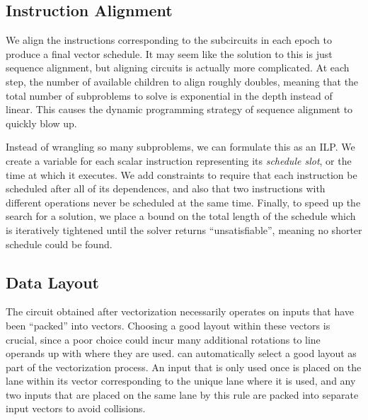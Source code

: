 \subsection{Instruction Alignment}\label{sec:instruction-alignment}
We align the instructions corresponding to the subcircuits in each epoch to produce a final vector schedule.
It may seem like the solution to this is just sequence alignment, but aligning circuits is actually more complicated.
At each step, the number of available children to align roughly doubles, meaning that the total number of subproblems to solve is exponential in the depth instead of linear. 
This causes the dynamic programming strategy of sequence alignment to quickly blow up.

Instead of wrangling so many subproblems, we can formulate this as an ILP.
We create a variable for each scalar instruction representing its {\em schedule slot}, or the time at which it executes.
We add constraints to require that each instruction be scheduled after all of its dependences, and also that two instructions with different operations never be scheduled at the same time. 
Finally, to speed up the search for a solution, we place a bound on the total length of the schedule which is iteratively tightened until the solver returns ``unsatisfiable'', meaning no shorter schedule could be found. %

\subsection{Data Layout}\label{sec:data-layout}
The circuit obtained after vectorization necessarily operates on inputs that have been ``packed'' into vectors.
Choosing a good layout within these vectors is crucial, since a poor choice could incur many additional rotations to line operands up with where they are used.
{\system} can automatically select a good layout as part of the vectorization process.
An input that is only used once is placed on the lane within its vector corresponding to the unique lane where it is used, and any two inputs that are placed on the same lane by this rule are packed into separate input vectors to avoid collisions.

